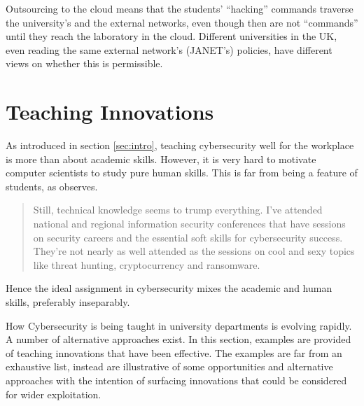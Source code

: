 \documentclass[conference]{IEEEtran}
\begin{document}
Outsourcing to the cloud means that the students' ``hacking'' commands traverse the university's and the external networks, even though then are not ``commands'' until they reach the laboratory in the cloud. Different universities in the UK, even reading the same external network's (JANET's) policies, have different views on whether this is permissible.






\section{Teaching Innovations}\label{sec:authors}
As introduced in section \ref{sec:intro}, teaching cybersecurity well for the workplace is more than about academic skills. However, it is very hard to motivate computer scientists to study pure human skills. This is far from being a feature of students, as \cite{Beaver2019c} observes.
\begin{quote}
Still, technical knowledge seems to trump everything. I've attended national and regional information security conferences that have sessions on security careers and the essential soft skills for cybersecurity success. They're not nearly as well attended as the sessions on cool and sexy topics like threat hunting, cryptocurrency and ransomware.
\end{quote}
Hence the ideal assignment in cybersecurity mixes the academic and human skills, preferably inseparably.

How Cybersecurity is being taught in university departments is evolving rapidly. A number of alternative approaches exist. In this section, examples are provided of teaching innovations that have been effective. The examples are far from an exhaustive list, instead are illustrative of some opportunities and alternative approaches with the intention of surfacing innovations that could be considered for wider exploitation.
\end{document}

